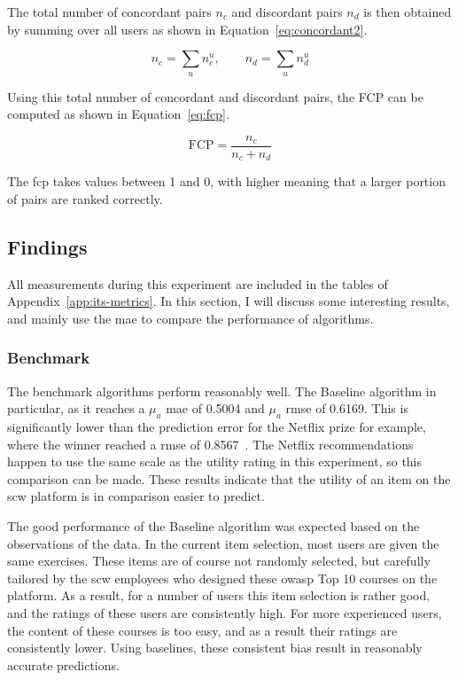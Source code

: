 The total number of concordant pairs $n_c$ and discordant pairs $n_d$ is then obtained by summing over all users as shown in Equation~\ref{eq:concordant2}.

\begin{equation}
    \label{eq:concordant2}
    n_{c} = \sum\limits_{u} n_{c}^{u},\qquad n_{d} = \sum\limits_{u} n_{d}^{u}
\end{equation}

Using this total number of concordant and discordant pairs, the FCP can be computed as shown in Equation~\ref{eq:fcp}.

\begin{equation}
    \label{eq:fcp}
    \text{FCP} = \frac{n_{c}}{n_{c} + n_{d}}
\end{equation}

The \gls{fcp} takes values between 1 and 0, with higher meaning that a larger portion of pairs are ranked correctly.


\subsection{Findings}
All measurements during this experiment are included in the tables of Appendix~\ref{app:its-metrics}.
In this section, I will discuss some interesting results, and mainly use the \gls{mae} to compare the performance of algorithms.

\subsubsection{Benchmark}
The benchmark algorithms perform reasonably well.
The Baseline algorithm in particular, as it reaches a $\mu_a$ \gls{mae} of 0.5004 and $\mu_a$ \gls{rmse} of 0.6169.
This is significantly lower than the prediction error for the Netflix prize for example, where the winner reached a \gls{rmse} of 0.8567~\cite{zhou2008large,netflixprizeforum,netflixprizeleaderboard}. 
The Netflix recommendations happen to use the same scale as the utility rating in this experiment, so this comparison can be made.
These results indicate that the utility of an item on the \gls{scw} platform is in comparison easier to predict.

The good performance of the Baseline algorithm was expected based on the observations of the data.
In the current item selection, most users are given the same exercises.
These items are of course not randomly selected, but carefully tailored by the \gls{scw} employees who designed these \gls{owasp} Top 10 courses on the platform.
As a result, for a number of users this item selection is rather good, and the ratings of these users are consistently high.
For more experienced users, the content of these courses is too easy, and as a result their ratings are consistently lower.
Using baselines, these consistent bias result in reasonably accurate predictions.

